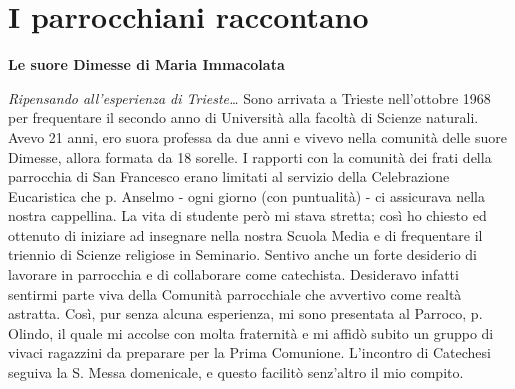 \chapter{I parrocchiani raccontano}
{}
\begin{center}
\textbf{\Large Le suore Dimesse di Maria Immacolata}
\end{center}
\bigbreak
\noindent \textit{Ripensando all’esperienza di Trieste…}
\medbreak
\noindent Sono arrivata a Trieste nell’ottobre 1968 per frequentare il secondo anno di Università alla
facoltà di Scienze naturali. Avevo 21 anni, ero suora professa da due anni e vivevo nella comunità 
delle suore Dimesse, allora formata da 18 sorelle. I rapporti con la comunità dei frati della 
parrocchia di San Francesco erano limitati al servizio della Celebrazione Eucaristica che p. 
Anselmo - ogni giorno (con puntualità) - ci assicurava nella nostra cappellina. La vita di studente 
però mi stava stretta; così ho chiesto ed ottenuto di iniziare ad insegnare nella nostra Scuola Media 
e di frequentare il triennio di Scienze religiose in Seminario. Sentivo anche un forte desiderio di 
lavorare in parrocchia e di collaborare come catechista. Desideravo infatti sentirmi parte viva della 
Comunità parrocchiale che avvertivo come realtà astratta. Così, pur senza alcuna esperienza, mi 
sono presentata al Parroco, p. Olindo, il quale mi accolse con molta fraternità e mi affidò subito un 
gruppo di vivaci ragazzini da preparare per la Prima Comunione. L’incontro di Catechesi seguiva la 
S. Messa domenicale, e questo facilitò senz’altro il mio compito. 

